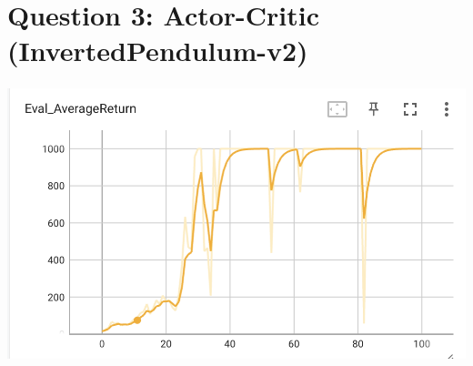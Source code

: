 \documentclass{article}
\begin{document}
\section{Question 3: Actor-Critic (InvertedPendulum-v2)}
\begin{answer}[title=Question 3,height=9.5cm,width=\linewidth]
\centering
\includegraphics[height=8cm]{q3.png}
\end{answer}
\end{document}
